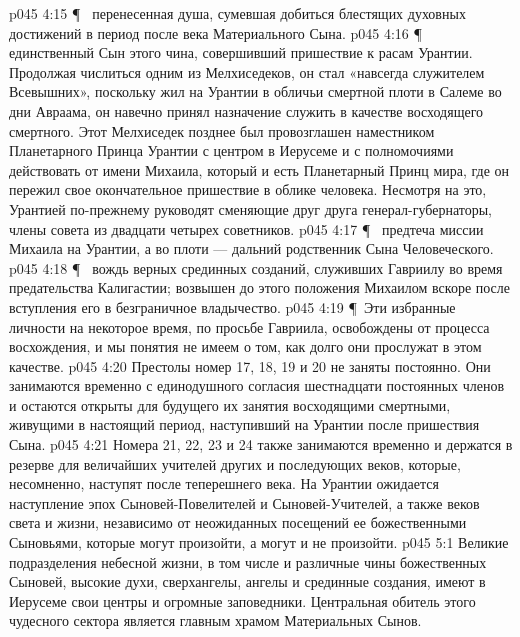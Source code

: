 \vs p045 4:15 \P\ \bibnobreakspace {} перенесенная душа, сумевшая добиться блестящих духовных достижений в период после века Материального Сына.
\vs p045 4:16 \P\ \bibnobreakspace {} единственный Сын этого чина, совершивший пришествие к расам Урантии. Продолжая числиться одним из Мелхиседеков, он стал «навсегда служителем Всевышних», поскольку жил на Урантии в обличьи смертной плоти в Салеме во дни Авраама, он навечно принял назначение служить в качестве восходящего смертного. Этот Мелхиседек позднее был провозглашен наместником Планетарного Принца Урантии с центром в Иерусеме и с полномочиями действовать от имени Михаила, который и есть Планетарный Принц мира, где он пережил свое окончательное пришествие в облике человека. Несмотря на это, Урантией по\hyp{}прежнему руководят сменяющие друг друга генерал\hyp{}губернаторы, члены совета из двадцати четырех советников.
\vs p045 4:17 \P\ \bibnobreakspace {} предтеча миссии Михаила на Урантии, а во плоти --- дальний родственник Сына Человеческого.
\vs p045 4:18 \P\ \bibnobreakspace {} вождь верных срединных созданий, служивших Гавриилу во время предательства Калигастии; возвышен до этого положения Михаилом вскоре после вступления его в безграничное владычество.
\vs p045 4:19 \P\ Эти избранные личности на некоторое время, по просьбе Гавриила, освобождены от процесса восхождения, и мы понятия не имеем о том, как долго они прослужат в этом качестве.
\vs p045 4:20 Престолы номер 17, 18, 19 и 20 не заняты постоянно. Они занимаются временно с единодушного согласия шестнадцати постоянных членов и остаются открыты для будущего их занятия восходящими смертными, живущими в настоящий период, наступивший на Урантии после пришествия Сына.
\vs p045 4:21 Номера 21, 22, 23 и 24 также занимаются временно и держатся в резерве для величайших учителей других и последующих веков, которые, несомненно, наступят после теперешнего века. На Урантии ожидается наступление эпох Сыновей\hyp{}Повелителей и Сыновей\hyp{}Учителей, а также веков света и жизни, независимо от неожиданных посещений ее божественными Сыновьями, которые могут произойти, а могут и не произойти.
\vs p045 5:1 Великие подразделения небесной жизни, в том числе и различные чины божественных Сыновей, высокие духи, сверхангелы, ангелы и срединные создания, имеют в Иерусеме свои центры и огромные заповедники. Центральная обитель этого чудесного сектора является главным храмом Материальных Сынов.
